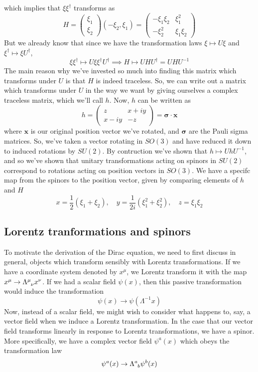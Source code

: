 \documentclass[11pt, oneside]{article}   	%
\theoremstyle{newline}
\theoremstyle{newline}
\theoremstyle{newline}
\theoremstyle{newline}
\theoremstyle{newline}
\begin{document}
which implies that $\xi \xi^\dagger$ transforms as \[ 
H = \begin{pmatrix} \xi_1 \\ \xi_2 \end{pmatrix} ( -\xi_2, \xi_1) = 
\begin{pmatrix}  - \xi_1 \xi_2 & \xi_1^2 \\  - \xi_2^2 & \xi_1 \xi_2 \end{pmatrix} \] 
But we already know that since we have the transformation laws $\xi \mapsto U \xi$ and $\xi^\dagger \mapsto \xi U^\dagger$, \[ 
\xi \xi^\dagger \mapsto U \xi \xi^\dagger U^\dagger \implies H \mapsto U H U^\dagger  = U H U^{ -1 }  \]
The main reason why we've invested so much into finding this matrix which transforms under $U$ is that $H$ is indeed traceless. So, we can write out a matrix which transforms under $U$ in the way we want by giving ourselves a complex traceless matrix, which we'll call $h$. Now, $h$ can be written as \[ h = \begin{pmatrix} z & x + iy \\ x - iy & - z  \end{pmatrix} = \mathbf {\sigma} \cdot \mathbf{x}  \] where $\mathbf{ x} $ is our original position vector we've rotated, and $\mathbf{\sigma} $ are the Pauli sigma matrices. So, we've taken a vector rotating in $SO ( 3) $ and have reduced it down to induced rotations by $SU(2) $. By contruction we've shown that $h \mapsto UhU^{ -1}$, and so we've shown that unitary transformations acting on spinors in $SU(2)$ correspond to rotations acting on position vectors in $SO ( 3) $. We have a specifc map from the spinors to the position vector, given by comparing elements of $h$ and $H$
\[ x = \frac{1}{ 2} ( \xi_1+ \xi_2), \quad y = \frac{ 1}{ 2i } (\xi_1^2 + \xi_2^2 ), \quad z = \xi_1 \xi_2 \] 


\subsection{Lorentz tranformations and spinors}  
To motivate the derivation of the Dirac equation, we need to first discuss in general, objects which transform sensibly with Lorentz transformations. If we have a coordinate system denoted by $x^\mu$, we Lorentz transform it with the map $x^\mu \rightarrow \Lambda\indices{^\mu_\nu} x^\nu$. If we had a scalar field $\psi(x)$, then this passive transformation would induce the transformation \[ 
\psi(x) \rightarrow \psi(\Lambda^{ -1} x) \] 
Now, instead of a scalar field, we might wish to consider what happens to, say, a vector field when we induce a Lorentz transformation. In the case that our vector field transforms linearly in response to Lorentz transformations, we have a spinor. More specifically, we have a complex vector field $\psi^a (x) $ which obeys the transformation law 
\[ \psi^a (x) \rightarrow \Lambda\indices{^a_b}\psi^b(x ) \] 
\end{document}
